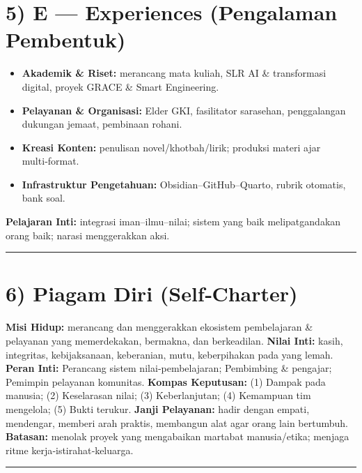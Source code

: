 \documentclass[
  letterpaper,
  DIV=11,
  numbers=noendperiod]{scrreprt}
\providecommand{\tightlist}{%
  \setlength{\itemsep}{0pt}\setlength{\parskip}{0pt}}
\begin{document}
\section{5) E --- Experiences (Pengalaman
Pembentuk)}\label{e-experiences-pengalaman-pembentuk}

\begin{itemize}
\tightlist
\item
  \textbf{Akademik \& Riset:} merancang mata kuliah, SLR AI \&
  transformasi digital, proyek GRACE \& Smart Engineering.
\item
  \textbf{Pelayanan \& Organisasi:} Elder GKI, fasilitator sarasehan,
  penggalangan dukungan jemaat, pembinaan rohani.
\item
  \textbf{Kreasi Konten:} penulisan novel/khotbah/lirik; produksi materi
  ajar multi‑format.
\item
  \textbf{Infrastruktur Pengetahuan:} Obsidian--GitHub--Quarto, rubrik
  otomatis, bank soal.
\end{itemize}

\textbf{Pelajaran Inti:} integrasi iman--ilmu--nilai; sistem yang baik
melipatgandakan orang baik; narasi menggerakkan aksi.

\begin{center}\rule{0.5\linewidth}{0.5pt}\end{center}

\section{6) Piagam Diri (Self‑Charter)}\label{piagam-diri-selfcharter}

\textbf{Misi Hidup:} merancang dan menggerakkan ekosistem pembelajaran
\& pelayanan yang memerdekakan, bermakna, dan berkeadilan. \textbf{Nilai
Inti:} kasih, integritas, kebijaksanaan, keberanian, mutu, keberpihakan
pada yang lemah. \textbf{Peran Inti:} Perancang sistem
nilai‑pembelajaran; Pembimbing \& pengajar; Pemimpin pelayanan
komunitas. \textbf{Kompas Keputusan:} (1) Dampak pada manusia; (2)
Keselarasan nilai; (3) Keberlanjutan; (4) Kemampuan tim mengelola; (5)
Bukti terukur. \textbf{Janji Pelayanan:} hadir dengan empati, mendengar,
memberi arah praktis, membangun alat agar orang lain bertumbuh.
\textbf{Batasan:} menolak proyek yang mengabaikan martabat
manusia/etika; menjaga ritme kerja‑istirahat‑keluarga.

\begin{center}\rule{0.5\linewidth}{0.5pt}\end{center}
\end{document}
